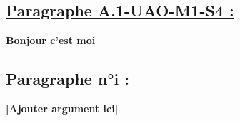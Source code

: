 \subsection{{\hyperref[Arg-A.1-UAO-M1-S4]{Paragraphe A.1-UAO-M1-S4 :}}}
\noindent \textbf{Bonjour c'est moi} \label{Par-A.1-UAO-M1-S4}

\subsection{{Paragraphe n°i :}}

\noindent \textbf{[Ajouter argument ici]}